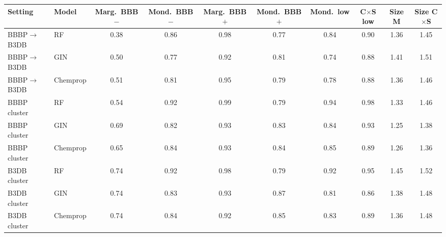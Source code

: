 \begin{tabular}{llcccccccc}
\toprule
Setting & Model & Marg.\ BBB$-$ & Mond.\ BBB$-$ & Marg.\ BBB$+$ & Mond.\ BBB$+$ & Mond.\ low & C$\times$S low & Size M & Size C$\times$S\\
\midrule
BBBP$\to$B3DB & RF & 0.38 & 0.86 & 0.98 & 0.77 & 0.84 & 0.90 & 1.36 & 1.45\\
BBBP$\to$B3DB & GIN & 0.50 & 0.77 & 0.92 & 0.81 & 0.74 & 0.88 & 1.41 & 1.51\\
BBBP$\to$B3DB & Chemprop & 0.51 & 0.81 & 0.95 & 0.79 & 0.78 & 0.88 & 1.36 & 1.46\\
BBBP cluster & RF & 0.54 & 0.92 & 0.99 & 0.79 & 0.94 & 0.98 & 1.33 & 1.46\\
BBBP cluster & GIN & 0.69 & 0.82 & 0.93 & 0.83 & 0.84 & 0.93 & 1.25 & 1.38\\
BBBP cluster & Chemprop & 0.65 & 0.84 & 0.93 & 0.84 & 0.85 & 0.89 & 1.26 & 1.36\\
B3DB cluster & RF & 0.74 & 0.92 & 0.98 & 0.79 & 0.92 & 0.95 & 1.45 & 1.52\\
B3DB cluster & GIN & 0.74 & 0.83 & 0.93 & 0.87 & 0.81 & 0.86 & 1.38 & 1.48\\
B3DB cluster & Chemprop & 0.74 & 0.84 & 0.92 & 0.85 & 0.83 & 0.89 & 1.36 & 1.48\\
\bottomrule
\end{tabular}
